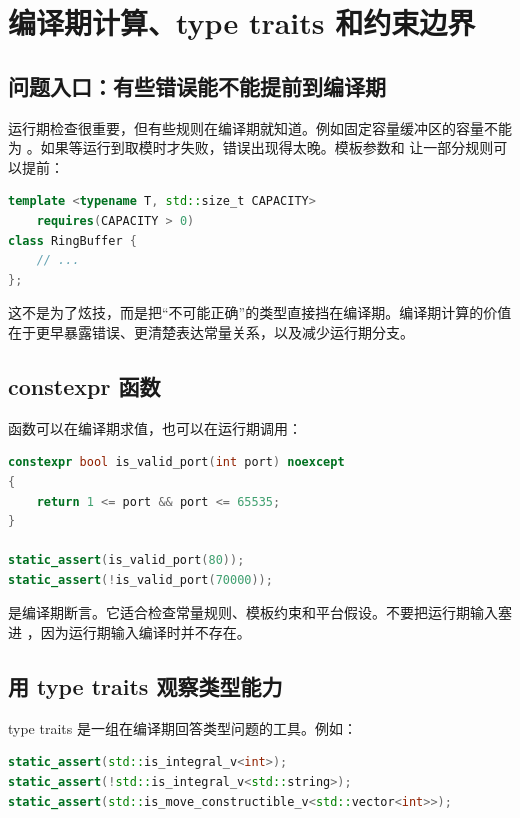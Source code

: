 \chapter{编译期计算、type traits 和约束边界}

\section{问题入口：有些错误能不能提前到编译期}

运行期检查很重要，但有些规则在编译期就知道。例如固定容量缓冲区的容量不能为 。如果等运行到取模时才失败，错误出现得太晚。模板参数和  让一部分规则可以提前：

\begin{lstlisting}[language=C++,caption={编译期容量检查}]
template <typename T, std::size_t CAPACITY>
    requires(CAPACITY > 0)
class RingBuffer {
    // ...
};
\end{lstlisting}

这不是为了炫技，而是把“不可能正确”的类型直接挡在编译期。编译期计算的价值在于更早暴露错误、更清楚表达常量关系，以及减少运行期分支。

\section{constexpr 函数}

 函数可以在编译期求值，也可以在运行期调用：

\begin{lstlisting}[language=C++,caption={端口范围检查}]
constexpr bool is_valid_port(int port) noexcept
{
    return 1 <= port && port <= 65535;
}

static_assert(is_valid_port(80));
static_assert(!is_valid_port(70000));
\end{lstlisting}

 是编译期断言。它适合检查常量规则、模板约束和平台假设。不要把运行期输入塞进 ，因为运行期输入编译时并不存在。

\section{用 type traits 观察类型能力}

type traits 是一组在编译期回答类型问题的工具。例如：

\begin{lstlisting}[language=C++,caption={检查类型属性}]
static_assert(std::is_integral_v<int>);
static_assert(!std::is_integral_v<std::string>);
static_assert(std::is_move_constructible_v<std::vector<int>>);
\end{lstlisting}

